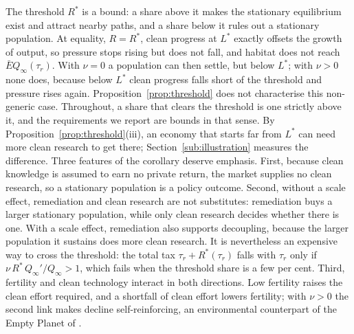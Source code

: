 \documentclass[11pt]{article}
\begin{document}
The threshold $R^\ast$ is a bound: a share above it makes the stationary equilibrium exist and attract
nearby paths, and a share below it rules out a stationary population. At equality, $R=R^\ast$, clean
progress at $L^\ast$ exactly offsets the growth of output, so pressure stops rising but does not fall,
and habitat does not reach $\bar EQ_\infty(\tau_r)$. With $\nu=0$ a population can then settle, but
below $L^\ast$; with $\nu>0$ none does, because below $L^\ast$ clean progress falls short of the
threshold and pressure rises again. Proposition~\ref{prop:threshold} does not characterise this
non-generic case. Throughout, a share
that clears the threshold is one strictly above it, and the requirements we report are bounds in that
sense.
By Proposition~\ref{prop:threshold}(iii), an economy that starts far from $L^\ast$ can need more clean
research to get there; Section~\ref{sub:illustration} measures the difference. Three features of the corollary deserve emphasis. First, because clean knowledge is assumed to earn
no private return, the market supplies no clean research, so a stationary population is a policy outcome. Second, without a scale effect, remediation and clean
research are not substitutes: remediation buys a larger stationary population, while only clean research
decides whether there is one. With a scale effect, remediation also supports decoupling, because the
larger population it sustains does more clean research. It is nevertheless an expensive way to cross the
threshold: the total tax $\tau_r+R^\ast(\tau_r)$ falls with $\tau_r$ only if $\nu\,R^\ast\,Q_\infty'/Q_\infty>1$,
which fails when the threshold share is a few per cent. Third, fertility and clean technology interact in
both directions. Low fertility raises the clean effort required, and a shortfall of clean effort lowers
fertility; with $\nu>0$ the second link makes decline self-reinforcing, an environmental counterpart of
the Empty Planet of \citet{jones22}.
\end{document}
